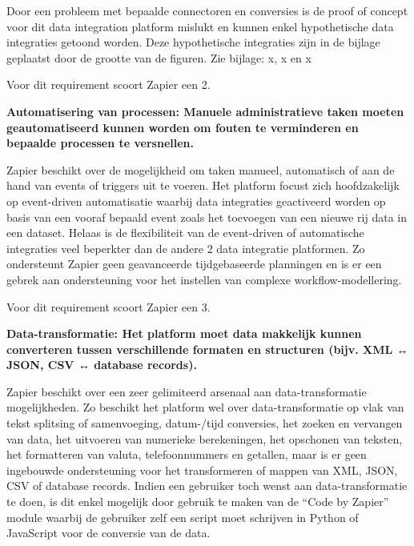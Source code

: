 \vspace{\baselineskip}

Door een probleem met bepaalde connectoren en conversies is de proof of concept voor dit data integration platform mislukt en kunnen enkel hypothetische data integraties getoond worden. Deze hypothetische integraties zijn in de bijlage geplaatst door de grootte van de figuren. Zie bijlage: x, x en x

Voor dit requirement scoort Zapier een 2.


\vspace{\baselineskip}

\textbf{Automatisering van processen: Manuele administratieve taken moeten geautomatiseerd kunnen worden om fouten te verminderen en bepaalde processen te versnellen.}

\vspace{\baselineskip}

Zapier beschikt over de mogelijkheid om taken manueel, automatisch of aan de hand van events of triggers uit te voeren. Het platform focust zich hoofdzakelijk op event-driven automatisatie waarbij data integraties geactiveerd worden op basis van een vooraf bepaald event zoals het toevoegen van een nieuwe rij data in een dataset. Helaas is de flexibiliteit van de event-driven of automatische integraties veel beperkter dan de andere 2 data integratie platformen. Zo ondersteunt Zapier geen geavanceerde tijdgebaseerde planningen en is er een gebrek aan ondersteuning voor het instellen van complexe workflow-modellering.


Voor dit requirement scoort Zapier een 3.

\vspace{\baselineskip}
\textbf{Data-transformatie: Het platform moet data makkelijk kunnen converteren tussen verschillende formaten en structuren (bijv. XML ↔ JSON, CSV ↔ database records).}

\vspace{\baselineskip}

Zapier beschikt over een zeer gelimiteerd arsenaal aan data-transformatie mogelijkheden. Zo beschikt het platform wel over data-transformatie op vlak van tekst splitsing of samenvoeging, datum-/tijd conversies, het zoeken en vervangen van data, het uitvoeren van numerieke berekeningen, het opschonen van teksten, het formatteren van valuta, telefoonnummers en getallen, maar is er geen ingebouwde ondersteuning voor het transformeren of mappen van XML, JSON, CSV of database records. Indien een gebruiker toch wenst aan data-transformatie te doen, is dit enkel mogelijk door gebruik te maken van de “Code by Zapier” module waarbij de gebruiker zelf een script moet schrijven in Python of JavaScript voor de conversie van de data.

